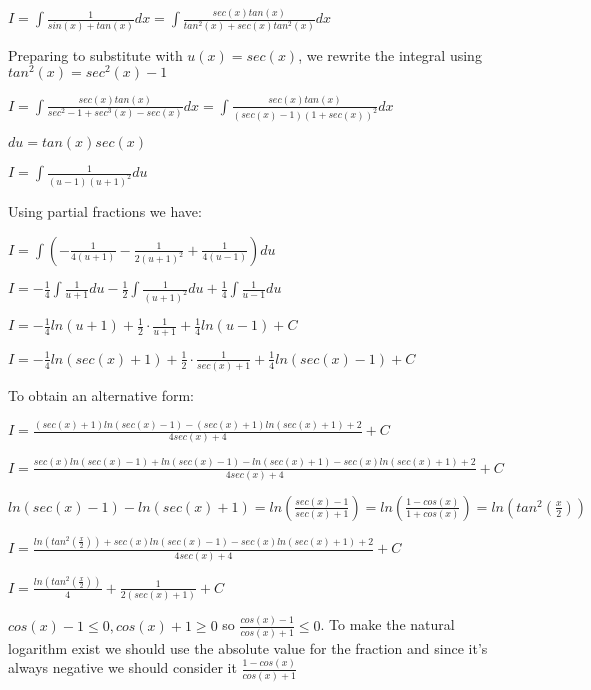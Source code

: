 \documentclass{article}
\begin{document}
{\begin{spacing}{\baselinestretch}
\begin{flushleft}
$I=\int\frac{1}{sin(x)+tan(x)}dx=\int\frac{sec(x)tan(x)}{tan^2(x)+sec(x)tan^2(x)}dx$

Preparing to substitute with $u(x)=sec(x)$, we rewrite the integral using $tan^2(x)=sec^2(x)-1$

$I=\int\frac{sec(x)tan(x)}{sec^2-1+sec^3(x)-sec(x)}dx=\int\frac{sec(x)tan(x)}{(sec(x)-1)(1+sec(x))^2}dx$

$du=tan(x)sec(x)$

$I=\int\frac{1}{(u-1)(u+1)^2}du$

Using partial fractions we have:

$I=\int\left(-\frac{1}{4(u+1)}-\frac{1}{2(u+1)^2}+\frac{1}{4(u-1)} \right)du$

$I=-\frac{1}{4}\int\frac{1}{u+1}du-\frac{1}{2}\int\frac{1}{(u+1)^2}du+\frac{1}{4}\int\frac{1}{u-1}du$

$I=-\frac{1}{4}ln(u+1)+\frac{1}{2}\cdot\frac{1}{u+1}+\frac{1}{4}ln(u-1)+C$

$I=-\frac{1}{4}ln(sec(x)+1)+\frac{1}{2}\cdot\frac{1}{sec(x)+1}+\frac{1}{4}ln(sec(x)-1)+C$

To obtain an alternative form:

$I=\frac{(sec(x)+1)ln(sec(x)-1)-(sec(x)+1)ln(sec(x)+1)+2}{4sec(x)+4}+C$

$I=\frac{sec(x)ln(sec(x)-1)+ln(sec(x)-1)-ln(sec(x)+1)-sec(x)ln(sec(x)+1)+2}{4sec(x)+4}+C$

$ln(sec(x)-1)-ln(sec(x)+1)=ln\left(\frac{sec(x)-1}{sec(x)+1}\right)=ln\left(\frac{1-cos(x)}{1+cos(x)}\right)=ln\left(tan^2\left(\frac{x}{2}\right)\right)$

$I=\frac{ln\left(tan^2\left(\frac{x}{2}\right)\right)+sec(x)ln(sec(x)-1)-sec(x)ln(sec(x)+1)+2}{4sec(x)+4} +C$

$I=\frac{ln(tan^2\left(\frac{x}{2}\right))}{4}+\frac{1}{2(sec(x)+1)}+C$

$cos(x)-1\le0, cos(x)+1\ge0$ so $\frac{cos(x)-1}{cos(x)+1}\le0$.
\newline
To make the natural logarithm exist we should use the absolute value for the fraction and since it's always negative we should consider it $ \frac{1-cos(x)}{cos(x)+1} $
\end{flushleft}


\end{spacing}}
\end{document}
